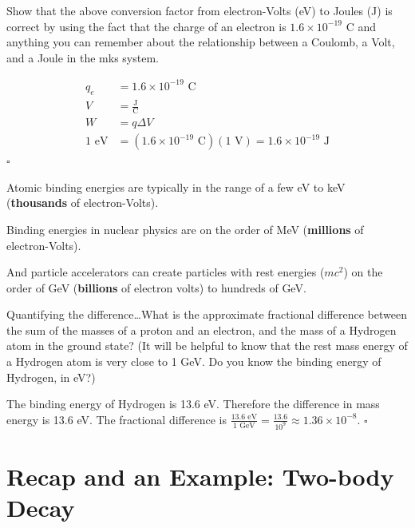 \documentclass[11pt, letterpaper, openany]{book}
\newenvironment{exercise}[1][Exercise]{%
  \tcolorbox[blanker, breakable, left=1em,
    before skip=1em, after skip=1em,
    borderline west={3pt}{0pt}{PhysNavy},
    colback=PhysCream,
    before upper={\textcolor{PhysNavy}{\sffamily\bfseries #1:}\space}
  ]%
}{%
  \endtcolorbox%
}
\newenvironment{solution}[1][Solution]{%
  \tcolorbox[blanker, breakable, left=1em,
    before skip=1em, after skip=1em,
    borderline west={2pt}{0pt}{PhysTeal},
    colback=PhysCream,
    before upper={\textcolor{PhysTeal}{\sffamily\bfseries #1.}\space}
  ]%
}{%
  \hfill\textcolor{PhysTeal}{\ensuremath{\square}}\endtcolorbox%
}
\begin{document}
\begin{exercise}[Quick Exercise]
Show that the above conversion factor from electron-Volts (eV) to Joules (J) is correct by using the fact that the charge of an electron is $1.6 \times 10^{-19}$ C and anything you can remember about the relationship between a Coulomb, a Volt, and a Joule in the mks system.
\end{exercise}
\begin{solution}
\begin{align*}
    q_e &= 1.6 \times 10^{-19} \text{ C} \\
    V &= \frac{\text{J}}{\text{C}} \\
    W &= q \Delta V \\
    1 \text{ eV} &= (1.6 \times 10^{-19} \text{ C})(1 \text{ V}) = 1.6 \times 10^{-19} \text{ J}
\end{align*}
\end{solution}

Atomic binding energies are typically in the range of a few eV to keV (\textbf{thousands} of electron-Volts).

Binding energies in nuclear physics are on the order of MeV (\textbf{millions} of electron-Volts).

And particle accelerators can create particles with rest energies ($mc^2$) on the order of GeV (\textbf{billions} of electron volts) to hundreds of GeV.

\begin{exercise}[Exercise 7]
Quantifying the difference\dots What is the approximate fractional difference between the sum of the masses of a proton and an electron, and the mass of a Hydrogen atom in the ground state?
(It will be helpful to know that the rest mass energy of a Hydrogen atom is very close to 1 GeV. Do you know the binding energy of Hydrogen, in eV?)
\end{exercise}
\begin{solution}
The binding energy of Hydrogen is 13.6 eV. Therefore the difference in mass energy is 13.6 eV.
The fractional difference is $\frac{13.6 \text{ eV}}{1 \text{ GeV}} = \frac{13.6}{10^9} \approx 1.36 \times 10^{-8}$.
\end{solution}

\chapter{Recap and an Example: Two-body Decay}
\end{document}
